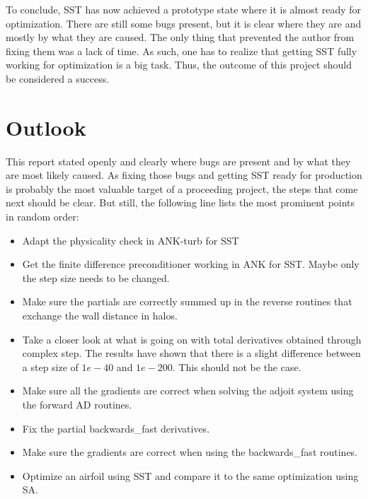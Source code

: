 To conclude, SST has now achieved a prototype state where it is almost ready
for optimization. There are still some bugs present, but it is clear where they
are and mostly by what they are caused. The only thing that prevented the
author from fixing them was a lack of time. As such, one has to realize that
getting SST fully working for optimization is a big task. Thus, the outcome of
this project should be considered a success.



\section{Outlook}
This report stated openly and clearly where bugs are present and by what they
are most likely caused. As fixing those bugs and getting SST ready for
production is probably the most valuable target of a proceeding project, the
steps that come next should be clear. But still, the following line lists the
most prominent points in random order:

\begin{itemize}
    \item Adapt the physicality check in ANK-turb for SST

    \item Get the finite difference preconditioner working in ANK for SST.
        Maybe only the step size needs to be changed.

    \item Make sure the partials are correctly summed up in the reverse
        routines that exchange the wall distance in halos.

    \item Take a closer look at what is going on with total derivatives
        obtained through complex step. The results have shown that there is a
        slight difference between a step size of $1e-40$ and $1e-200$. This
        should not be the case.
        
    \item Make sure all the gradients are correct when solving the adjoit system
        using the forward AD routines.

    \item Fix the partial backwards\_fast derivatives.

    \item Make sure the gradients are correct when using the backwards\_fast
        routines.

    \item Optimize an airfoil using SST and compare it to the same optimization
        using SA.
\end{itemize}

